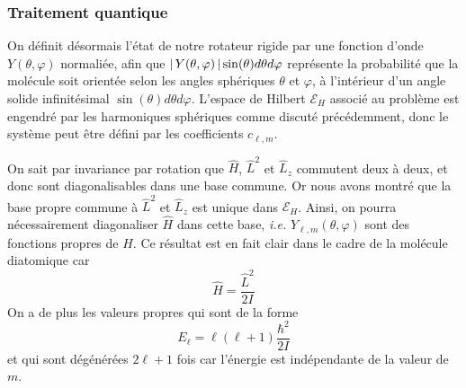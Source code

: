         \subsubsection{Traitement quantique}

        On définit désormais l’état de notre rotateur rigide par une fonction d’onde $Y(\theta, \varphi)$ normaliée, afin que $\left\lvert \, Y(\theta, \varphi) \, \right\rvert\sin(\theta)d\theta d\varphi$ représente la probabilité que la molécule soit orientée selon les angles sphériques $\theta$ et $\varphi$, à l’intérieur d’un angle solide infinitésimal $\sin(\theta)d\theta d\varphi$. L’espace de Hilbert $\mathcal{E}_H$ associé au problème est engendré par les harmoniques sphériques comme discuté précédemment, donc le système peut être défini par les coefficients $c_{\ell,m}$. 

        On sait par invariance par rotation que $\hat{H}$, $\hat{L}^2$ et $\hat{L}_z$ commutent deux à deux, et donc sont diagonalisables dans une base commune. Or nous avons montré que la base propre commune à $\hat{L}^2$ et $\hat{L}_z$ est unique dans $\mathcal{E}_H$. Ainsi, on pourra nécessairement diagonaliser $\hat{H}$ dans cette base, \textit{i.e.} $Y_{\ell, m}(\theta, \varphi)$ sont des fonctions propres de $\hat{H}$. Ce résultat est en fait clair dans le cadre de la molécule diatomique car 
        \[ \hat{H} = \frac{\hat{L}^2}{2I} \]   
        On a de plus les valeurs propres qui sont de la forme 
        \[ E_{\ell} = \ell (\ell + 1) \frac{\hbar^2}{2I} \]  
        et qui sont dégénérées $2 \ell + 1$ fois car l’énergie est indépendante de la valeur de $m$. 